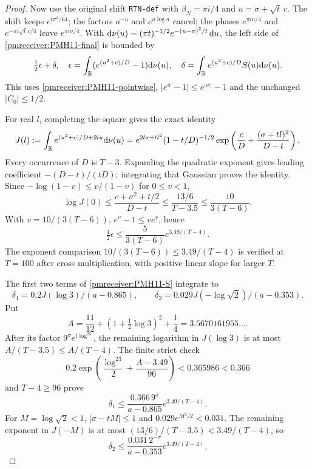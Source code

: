 \begin{proof}
Now use the original shift \texttt{RTN-def} with $\beta_N=\pi i/4$
and $u=\sigma+\sqrt t\,v$. The shift keeps $e^{t\pi^2/64}$;
the factors $a^{-u}$ and $e^{u\log a}$ cancel; the phases
$e^{\pi iu/4}$ and $e^{-\pi i\sqrt t v/4}$ leave
$e^{\pi i\sigma/4}$. With
$\mathrm d\nu(u)=(\pi t)^{-1/2}e^{-(u-\sigma)^2/t}\,\mathrm d u$,
the left side of \eqref{pmreceiver:PMH11-final} is bounded by
\begin{equation}\label{pmreceiver:PMH11-epsdelta}
 \tfrac12\epsilon+\delta,\quad
 \epsilon=\int_\mathbb R(e^{(u^2+c)/D}-1)\mathrm d\nu(u),\quad
 \delta=\int_\mathbb R e^{(u^2+c)/D}S(u)\mathrm d\nu(u).
\end{equation}
This uses \eqref{pmreceiver:PMH11-pointwise}, $|e^w-1|\le e^{|w|}-1$ and
the unchanged $|C_0|\le1/2$.

For real $l$, completing the square gives the exact identity
\begin{equation}\label{pmreceiver:PMH11-Gaussian}
 J(l):=\int_\mathbb R e^{(u^2+c)/D+2lu}\mathrm d\nu(u)
 =e^{2l\sigma+tl^2}(1-t/D)^{-1/2}
       \exp\left(\frac cD+\frac{(\sigma+tl)^2}{D-t}\right).
\end{equation}
Every occurrence of $D$ is $T-3$. Expanding the quadratic exponent
gives leading coefficient $-(D-t)/(tD)$; integrating that Gaussian
proves the identity. Since $-\log(1-v)\le v/(1-v)$ for
$0\le v<1$,
\[
 \log J(0)\le\frac{c+\sigma^2+t/2}{D-t}
 \le\frac{13/6}{T-3.5}\le\frac{10}{3(T-6)}.
\]
With $v=10/(3(T-6))$, $e^v-1\le ve^v$, hence
\begin{equation}\label{pmreceiver:PMH11-epsilon}
 \tfrac12\epsilon\le\frac5{3(T-6)}e^{3.49/(T-4)}.
\end{equation}
The exponent comparison $10/(3(T-6))\le3.49/(T-4)$ is verified
at $T=100$ after cross multiplication, with positive linear slope
for larger $T$.

The first two terms of \eqref{pmreceiver:PMH11-S} integrate to
\[\delta_1=0.2J(\log3)/(a-0.865),\qquad
\delta_2=0.029J(-\log\sqrt2)/(a-0.353).\]
Put
\[
 A=\frac{11}{12}+(1+\tfrac12\log3)^2+\frac14
       =3.5670161955\ldots.
\]
After its factor $9^\sigma e^{t\log^23}$, the remaining
logarithm in $J(\log3)$ is at most
$A/(T-3.5)\le A/(T-4)$. The finite strict check
\begin{equation}\label{pmreceiver:PMH11-absorb}
 0.2\exp\left(\frac{\log^23}{2}+\frac{A-3.49}{96}\right)
 <0.365986<0.366
\end{equation}
and $T-4\ge96$ prove
\[
 \delta_1\le\frac{0.366\,9^\sigma}{a-0.865}e^{3.49/(T-4)}.
\]
For $M=\log\sqrt2<1$, $|\sigma-tM|\le1$ and
$0.029e^{M^2/2}<0.031$. The remaining exponent in $J(-M)$ is
at most $(13/6)/(T-3.5)<3.49/(T-4)$, so
\[
 \delta_2\le\frac{0.031\,2^{-\sigma}}{a-0.353}e^{3.49/(T-4)}.
\]


\end{proof}
